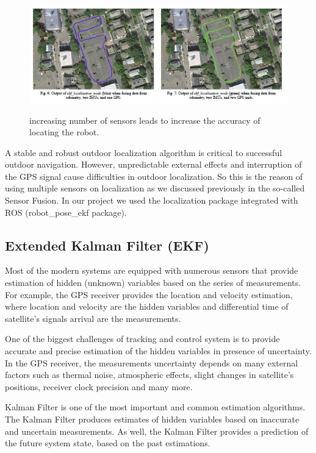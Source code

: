    \begin{figure}[H]%
    \center%
    \includegraphics[width=.9\textwidth]{images/Alaa/sensorFusion2.JPG}%
    \caption[Sensor Fusion]{increasing number of sensors leads to increase the accuracy of locating the robot.}\cite{web035}\label{fig: Sensor Fusion}%
  \end{figure}
  
A stable and robust outdoor localization algorithm is critical to successful outdoor navigation. However, unpredictable external effects and interruption of the GPS signal cause difficulties in outdoor localization. So this is the reason of using multiple sensors on localization as we discussed previously in the so-called Sensor Fusion.
In our project we used the localization package integrated with ROS (robot\_pose\_ekf package).

\subsection {Extended Kalman Filter (EKF)}
\hspace{2cm} Most of the modern systems are equipped with numerous sensors that provide estimation of hidden (unknown) variables based on the series of measurements. For example, the GPS receiver provides the location and velocity estimation, where location and velocity are the hidden variables and differential time of satellite's signals arrival are the measurements.

One of the biggest challenges of tracking and control system is to provide accurate and precise estimation of the hidden variables in presence of uncertainty. In the GPS receiver, the measurements uncertainty depends on many external factors such as thermal noise, atmospheric effects, slight changes in satellite's positions, receiver clock precision and many more.

Kalman Filter is one of the most important and common estimation algorithms. The Kalman Filter produces estimates of hidden variables based on inaccurate and uncertain measurements. As well, the Kalman Filter provides a prediction of the future system state, based on the past estimations.


